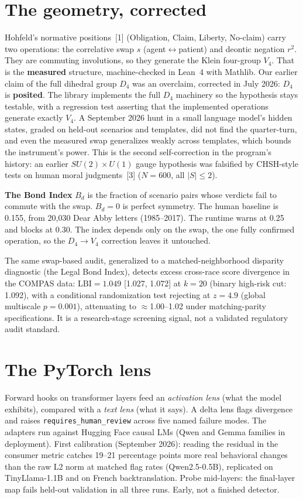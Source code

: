 \documentclass[11pt,twocolumn]{extarticle}
\begin{document}
\section{The geometry, corrected}
Hohfeld's normative positions~[1] (Obligation, Claim, Liberty, No-claim) carry two operations:
the correlative swap $s$ (agent$\leftrightarrow$patient) and deontic negation $r^2$. They
are commuting involutions, so they generate the Klein four-group $V_4$. That is the
\textbf{measured} structure, machine-checked in Lean~4 with Mathlib.
Our earlier claim of the full dihedral group $D_4$ was an overclaim, corrected in July
2026: $D_4$ is \textbf{posited}. The library implements the full $D_4$ machinery so the
hypothesis stays testable, with a regression test asserting that the implemented
operations generate exactly $V_4$. A September 2026 hunt in a small language model's hidden
states, graded on held-out scenarios and templates, did not find the quarter-turn, and
even the measured swap generalizes weakly across templates, which bounds the instrument's
power. This is the second self-correction in the program's history: an earlier
$SU(2)\times U(1)$ gauge hypothesis was falsified by CHSH-style tests on human moral
judgments~[3] ($N{=}600$, all $|S|\le 2$).

\textbf{The Bond Index} $B_d$ is the fraction of scenario pairs whose verdicts fail to
commute with the swap. $B_d=0$ is perfect symmetry. The human baseline is 0.155, from
20{,}030 Dear Abby letters (1985--2017). The runtime warns at 0.25 and blocks at 0.30. The
index depends only on the swap, the one fully confirmed operation, so the $D_4\to V_4$
correction leaves it untouched.

The same swap-based audit, generalized to a matched-neighborhood disparity diagnostic (the
Legal Bond Index), detects excess cross-race score divergence in the COMPAS data:
$\mathrm{LBI}=1.049$ [1.027, 1.072] at $k{=}20$ (binary high-risk cut: 1.092), with a
conditional randomization test rejecting at $z=4.9$ (global multiscale $p=0.001$),
attenuating to $\approx$1.00--1.02 under matching-parity specifications. It is a
research-stage screening signal, not a validated regulatory audit standard.

\section{The PyTorch lens}
Forward hooks on transformer layers feed an \emph{activation lens} (what the model
exhibits), compared with a \emph{text lens} (what it says). A delta lens flags divergence
and raises \texttt{requires\_human\_review} across five named failure modes. The adapters
run against Hugging Face causal LMs (Qwen and Gemma families in deployment). First calibration (September 2026): reading
the residual in the consumer metric catches 19--21 percentage points more real behavioral
changes than the raw L2 norm at matched flag rates (Qwen2.5-0.5B), replicated on
TinyLlama-1.1B and on French backtranslation. Probe mid-layers: the final-layer map fails
held-out validation in all three runs. Early, not a finished detector.
\end{document}
